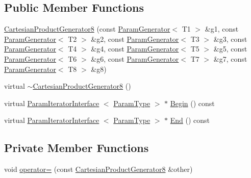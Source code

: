 \subsection*{\-Public \-Member \-Functions}
\begin{DoxyCompactItemize}
\item 
\hyperlink{classtesting_1_1internal_1_1CartesianProductGenerator8_a57b7e26ae06a1c79ed429a88a8f1d7b5}{\-Cartesian\-Product\-Generator8} (const \hyperlink{classtesting_1_1internal_1_1ParamGenerator}{\-Param\-Generator}$<$ \-T1 $>$ \&g1, const \hyperlink{classtesting_1_1internal_1_1ParamGenerator}{\-Param\-Generator}$<$ \-T2 $>$ \&g2, const \hyperlink{classtesting_1_1internal_1_1ParamGenerator}{\-Param\-Generator}$<$ \-T3 $>$ \&g3, const \hyperlink{classtesting_1_1internal_1_1ParamGenerator}{\-Param\-Generator}$<$ \-T4 $>$ \&g4, const \hyperlink{classtesting_1_1internal_1_1ParamGenerator}{\-Param\-Generator}$<$ \-T5 $>$ \&g5, const \hyperlink{classtesting_1_1internal_1_1ParamGenerator}{\-Param\-Generator}$<$ \-T6 $>$ \&g6, const \hyperlink{classtesting_1_1internal_1_1ParamGenerator}{\-Param\-Generator}$<$ \-T7 $>$ \&g7, const \hyperlink{classtesting_1_1internal_1_1ParamGenerator}{\-Param\-Generator}$<$ \-T8 $>$ \&g8)
\item 
virtual \hyperlink{classtesting_1_1internal_1_1CartesianProductGenerator8_a21836a50e981d8bda36f8ba31d4740f0}{$\sim$\-Cartesian\-Product\-Generator8} ()
\item 
virtual \hyperlink{classtesting_1_1internal_1_1ParamIteratorInterface}{\-Param\-Iterator\-Interface}\*
$<$ \hyperlink{classtesting_1_1internal_1_1CartesianProductGenerator8_a1323810362151af79d39617fabdcade1}{\-Param\-Type} $>$ $\ast$ \hyperlink{classtesting_1_1internal_1_1CartesianProductGenerator8_ab6a1e6ee0c9095fec4ca7dd2fe9736cd}{\-Begin} () const 
\item 
virtual \hyperlink{classtesting_1_1internal_1_1ParamIteratorInterface}{\-Param\-Iterator\-Interface}\*
$<$ \hyperlink{classtesting_1_1internal_1_1CartesianProductGenerator8_a1323810362151af79d39617fabdcade1}{\-Param\-Type} $>$ $\ast$ \hyperlink{classtesting_1_1internal_1_1CartesianProductGenerator8_a2175654afa23856e885489861c353c72}{\-End} () const 
\end{DoxyCompactItemize}
\subsection*{\-Private \-Member \-Functions}
\begin{DoxyCompactItemize}
\item 
void \hyperlink{classtesting_1_1internal_1_1CartesianProductGenerator8_a74d7197b2bd1a0915cbc2cfbc27d6214}{operator=} (const \hyperlink{classtesting_1_1internal_1_1CartesianProductGenerator8}{\-Cartesian\-Product\-Generator8} \&other)
\end{DoxyCompactItemize}
